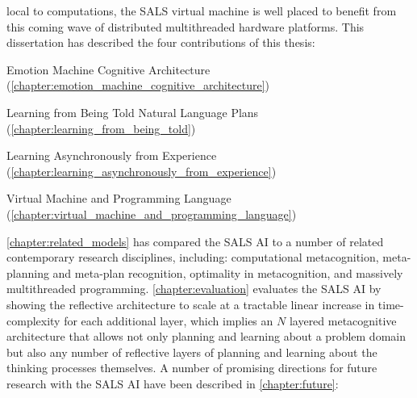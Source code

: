 local to computations, the SALS virtual machine is well placed to
benefit from this coming wave of distributed multithreaded hardware
platforms.  This dissertation has described the four contributions of
this thesis:
\begin{samepage}
\begin{packed_enumerate}
\item Emotion Machine Cognitive Architecture
  ({\mbox{\autoref{chapter:emotion_machine_cognitive_architecture}}})
\item Learning from Being Told Natural Language Plans
  ({\mbox{\autoref{chapter:learning_from_being_told}}})
\item Learning Asynchronously from Experience
  ({\mbox{\autoref{chapter:learning_asynchronously_from_experience}}})
\item Virtual Machine and Programming Language
  ({\mbox{\autoref{chapter:virtual_machine_and_programming_language}}})
\end{packed_enumerate}
\end{samepage}
{\mbox{\autoref{chapter:related_models}}} has compared the SALS AI to
a number of related contemporary research disciplines, including:
computational metacognition, meta-planning and meta-plan recognition,
optimality in metacognition, and massively multithreaded programming.
{\mbox{\autoref{chapter:evaluation}}} evaluates the SALS AI by showing
the reflective architecture to scale at a tractable linear increase in
time-complexity for each additional layer, which implies an $N$
layered metacognitive architecture that allows not only planning and
learning about a problem domain but also any number of reflective
layers of planning and learning about the thinking processes
themselves.  A number of promising directions for future research with
the SALS AI have been described in {\mbox{\autoref{chapter:future}}}:
